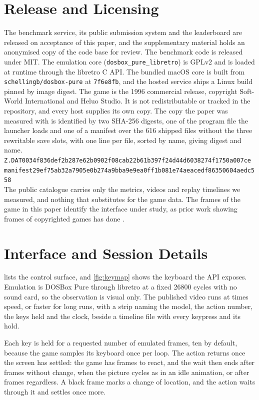 \documentclass{article} %
\begin{document}
\section{Release and Licensing}
\label{app:licence}
The benchmark service, its public submission system and the leaderboard are released on acceptance of this paper, and the supplementary material holds an anonymised copy of the code base for review. The benchmark code is released under MIT. The emulation core
(\texttt{dosbox\_pure\_libretro}) is GPLv2 and is loaded at runtime through the libretro C API. The bundled macOS core is built from \texttt{schellingb/dosbox-pure} at \texttt{7f6e8fb}, and the hosted
service ships a Linux build pinned by image digest. The game is the 1996
commercial release, copyright Soft-World International and
Heluo Studio. It is not redistributable or tracked in the repository, and every host supplies its own copy. The copy the paper was measured with is identified by two SHA-256 digests, one of the program file the launcher loads and one of a manifest over the 616 shipped files without the three rewritable save slots, with one line per file, sorted by name, giving digest and name.\\ \texttt{\footnotesize Z.DAT\quad 0034f836def2b287e62b0902f08cab22b61b397f24d44d6038274f1750a007ce}\\ \texttt{\footnotesize manifest\quad 29ef75ab32a7905e0b274a9bba9e9ea0ff1b081e74aeacedf86350604aedc558}\\ The public catalogue carries only the metrics, videos
and replay timelines we measured, and nothing that substitutes for the game
data. The frames of the game in this paper
identify the interface under study, as prior work showing frames of
copyrighted games has done \citep{paglieri2025balrog}.

\section{Interface and Session Details}
\label{app:infra}
 lists the control surface, and \cref{fig:keymap} shows the keyboard the API exposes. Emulation is DOSBox Pure through libretro at a fixed 26800 cycles with no sound card, so the observation is visual only. The published video runs at \DefaultReplaySpeed{} times speed, or faster for long runs, with a strip naming the model, the action number, the keys held and the clock, beside a timeline file with every keypress and its hold.

Each key is held for a requested number of emulated frames, ten by default, because the game samples its keyboard once per loop. The action returns once the screen has settled: the game has \MsettleReact{} frames to react, and the wait then ends after \MsettleStable{} frames without change, when the picture cycles as in an idle animation, or after \MsettleMax{} frames regardless. A black frame marks a change of location, and the action waits through it and settles once more.
\end{document}
